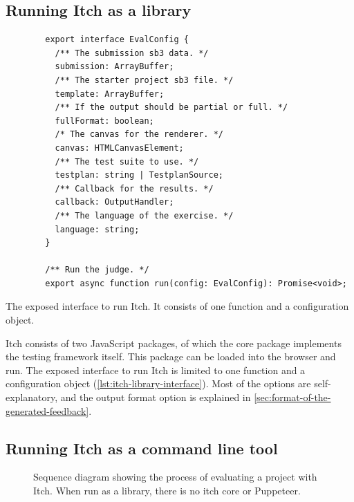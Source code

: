 \documentclass[../main]{subfiles}
\begin{document}
\subsection{Running Itch as a library}\label{subsec:running-itch-as-a-library}

\begin{listing}
    \begin{verbatim}
        export interface EvalConfig {
          /** The submission sb3 data. */
          submission: ArrayBuffer;
          /** The starter project sb3 file. */
          template: ArrayBuffer;
          /** If the output should be partial or full. */
          fullFormat: boolean;
          /* The canvas for the renderer. */
          canvas: HTMLCanvasElement;
          /** The test suite to use. */
          testplan: string | TestplanSource;
          /** Callback for the results. */
          callback: OutputHandler;
          /** The language of the exercise. */
          language: string;
        }

        /** Run the judge. */
        export async function run(config: EvalConfig): Promise<void>;
    \end{verbatim}
    \caption{The exposed interface to run Itch. It consists of one function and a configuration object.}\label{lst:itch-library-interface}
\end{listing}

Itch consists of two JavaScript packages, of which the core package implements the testing framework itself.
This package can be loaded into the browser and run.
The exposed interface to run Itch is limited to one function and a configuration object (\cref{lst:itch-library-interface}).
Most of the options are self-explanatory, and the output format option is explained in \cref{sec:format-of-the-generated-feedback}.

\subsection{Running Itch as a command line tool}\label{subsec:running-itch-as-a-command-line-tool}

\begin{figure}
    \begin{wide}
        
    \end{wide}
    \caption{Sequence diagram showing the process of evaluating a project with Itch. When run as a library, there is no itch core or Puppeteer.}
    \label{fig:itch-sequence-diagram}
\end{figure}
\end{document}
